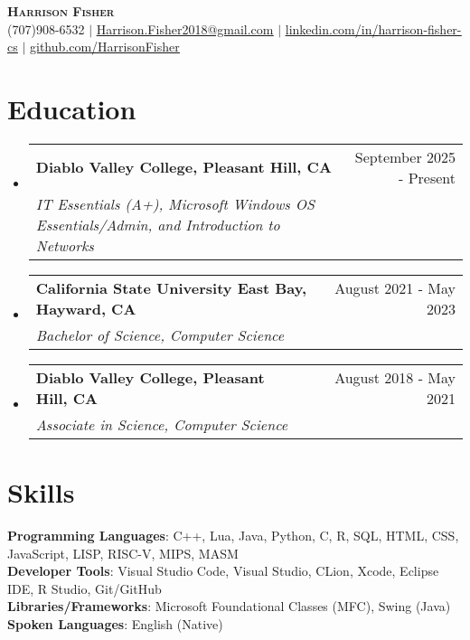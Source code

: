 \documentclass[letterpaper, 11pt]{article}
\makeatletter
\newcommand{\resumeSubheading}[4]{
  \vspace{-2pt}\item
    \begin{tabular*}{0.97\textwidth}[t]{l@{\extracolsep{\fill}}r}
      \textbf{#1} & #2 \\
      \textit{\small#3} & \textit{\small #4} \\
    \end{tabular*}\vspace{-7pt}
}
\newcommand{\resumeSubHeadingListStart}{\begin{itemize}[leftmargin=0.15in, label={}]}
\newcommand{\resumeSubHeadingListEnd}{\end{itemize}}
\makeatother
\begin{document}

\begin{center}
    \textbf{\Huge \scshape Harrison Fisher} \\ \vspace{7pt}
    \small (707)908-6532 $ | $ 
    \href{Harrison.Fisher2018@gmail.com}{\underline{Harrison.Fisher2018@gmail.com}} $ | $ 
    \href{https://www.linkedin.com/in/harrison-fisher-cs/}{\underline{\faLinkedin \hspace{1pt} linkedin.com/in/harrison-fisher-cs}} $ | $
    \href{https://github.com/HarrisonFisher}{\underline{\faGithub \hspace{1pt} github.com/HarrisonFisher}}
\end{center}




  

\section{Education}
  \resumeSubHeadingListStart

   \resumeSubheading
      {Diablo Valley College, Pleasant Hill, CA}{September 2025 - Present}
      {IT Essentials (A+), Microsoft Windows OS Essentials/Admin, and Introduction to Networks}{}
      
    \resumeSubheading
      {California State University East Bay, Hayward, CA}{August 2021 - May 2023}
      {Bachelor of Science, Computer Science}{}

    \resumeSubheading
      {Diablo Valley College, Pleasant Hill, CA}{August 2018 - May 2021}
      {Associate  in Science, Computer Science}{}
  \resumeSubHeadingListEnd
  
\section{Skills}
 \begin{itemize}[leftmargin=0.15in, label={}]
    \small{\item{
     \textbf{Programming Languages}{: C++, Lua, Java, Python, C, R, SQL, HTML, CSS, JavaScript, LISP, RISC-V, MIPS, MASM} \\
     \textbf{Developer Tools}{: Visual Studio Code, Visual Studio, CLion, Xcode, Eclipse IDE, R Studio, Git/GitHub} \\
     \textbf{Libraries/Frameworks}{: Microsoft Foundational Classes (MFC), Swing (Java)} \\
     \textbf{Spoken Languages}{: English (Native)} \\
    }}
 \end{itemize}
\end{document}
